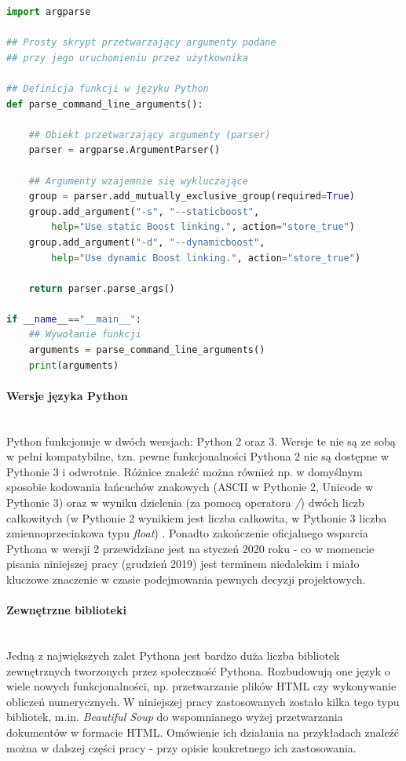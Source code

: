 \begin{lstlisting}[language=python,caption={Przykład prostego skryptu napisanego w języku Python 3 - przetwarzanie argumentów podanych przez użytkownika do skryptu}, label={lst:pyexample}]
import argparse

## Prosty skrypt przetwarzający argumenty podane 
## przy jego uruchomieniu przez użytkownika

## Definicja funkcji w języku Python
def parse_command_line_arguments():

    ## Obiekt przetwarzający argumenty (parser)
    parser = argparse.ArgumentParser()

    ## Argumenty wzajemnie się wykluczające
    group = parser.add_mutually_exclusive_group(required=True)
    group.add_argument("-s", "--staticboost", 
        help="Use static Boost linking.", action="store_true")
    group.add_argument("-d", "--dynamicboost",
        help="Use dynamic Boost linking.", action="store_true")

    return parser.parse_args()

if __name__=="__main__":
    ## Wywołanie funkcji
    arguments = parse_command_line_arguments()
    print(arguments)


\end{lstlisting}

\paragraph*{Wersje języka Python}\mbox{} \\
Python funkcjonuje w dwóch wersjach: Python 2 oraz 3. Wersje te nie są ze sobą w pełni kompatybilne, tzn. pewne funkcjonalności Pythona 2 nie są dostępne w Pythonie 3 i odwrotnie. Różnice znaleźć można również np. w domyślnym sposobie kodowania łańcuchów znakowych (ASCII w Pythonie 2, Unicode w Pythonie 3) oraz w wyniku dzielenia (za pomocą operatora \textit{/}) dwóch liczb całkowitych (w Pythonie 2 wynikiem jest liczba całkowita, w Pythonie 3 liczba zmiennoprzecinkowa typu \textit{float}) \cite{Python2vs3}. Ponadto zakończenie oficjalnego wsparcia Pythona w wersji 2 przewidziane jest na styczeń 2020 roku \cite{Python2Countdown} - co w momencie pisania niniejszej pracy (grudzień 2019) jest terminem niedalekim i miało kluczowe znaczenie w czasie podejmowania pewnych decyzji projektowych.

\paragraph*{Zewnętrzne biblioteki}\mbox{} \\
Jedną z największych zalet Pythona jest bardzo duża liczba bibliotek zewnętrznych tworzonych przez społeczność Pythona. Rozbudowują one język o wiele nowych funkcjonalności, np. przetwarzanie plików HTML czy wykonywanie obliczeń numerycznych. W niniejszej pracy zastosowanych zostało kilka tego typu bibliotek, m.in. \textit{Beautiful Soup} do wspomnianego wyżej przetwarzania dokumentów w formacie HTML. Omówienie ich działania na przykładach znaleźć można w dalszej części pracy - przy opisie konkretnego ich zastosowania. 



